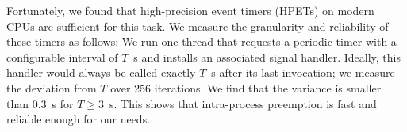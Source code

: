 Fortunately, we found that high-precision event timers (HPETs) on modern CPUs
are sufficient for this task. We measure the granularity and reliability of
these timers as follows: We run one thread that requests a periodic timer with a
configurable interval of $T$~\textmu{}s and installs an associated signal handler.
Ideally, this handler would always be called exactly $T$~\textmu{}s after its last
invocation; we measure the deviation from $T$ over 256 iterations.
We find that the variance
is smaller than 0.3~\textmu{}s for $T \ge 3$~\textmu{}s. This shows that
intra-process preemption is fast and reliable enough for our needs.

